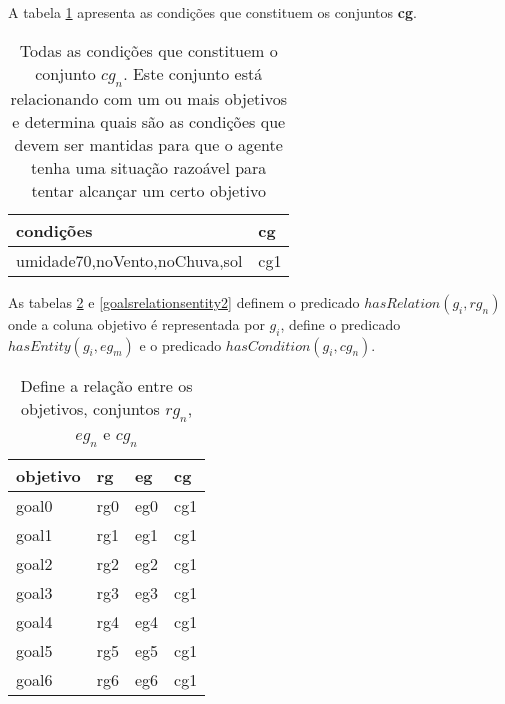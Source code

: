 A tabela \ref{conditions} apresenta as condições que constituem os conjuntos \textbf{cg}.

\begin{table}[H]
\centering
{}
\begin{tabular}{|l|l|}
\hline
\textbf{condições}         & \textbf{cg} \\ \hline
umidade70,noVento,noChuva,sol & cg1         \\ \hline
\end{tabular}
\caption{Todas as condições que constituem o conjunto $cg_n$. Este conjunto está relacionando com um ou mais objetivos e determina quais são as condições que devem ser mantidas para que o agente tenha uma situação razoável para tentar alcançar um certo objetivo}
\label{conditions}
\end{table}


As tabelas \ref{goalsrelationsentity1} e \ref{goalsrelationsentity2} definem o predicado $hasRelation(g_i,rg_n)$ onde a coluna objetivo é representada por $g_i$, define o predicado  $hasEntity(g_i,eg_m)$ e o predicado $hasCondition(g_i,cg_n)$.  

\begin{table}[H]
\centering
{}
\begin{tabular}{|l|l|l|l|}
\hline
\textbf{objetivo}  & \textbf{rg} & \textbf{eg} & \textbf{cg} \\ \hline
goal0 & rg0 & eg0 & cg1 \\ \hline
goal1 & rg1 & eg1 & cg1 \\ \hline
goal2 & rg2 & eg2 & cg1 \\ \hline
goal3 & rg3 & eg3 & cg1 \\ \hline
goal4 & rg4 & eg4 & cg1 \\ \hline
goal5 & rg5 & eg5 & cg1 \\ \hline
goal6 & rg6 & eg6 & cg1 \\ \hline		
\end{tabular}
\caption{Define a relação entre os objetivos, conjuntos $rg_n$, $eg_n$ e $cg_n$ }
\label{goalsrelationsentity1}
\end{table}

